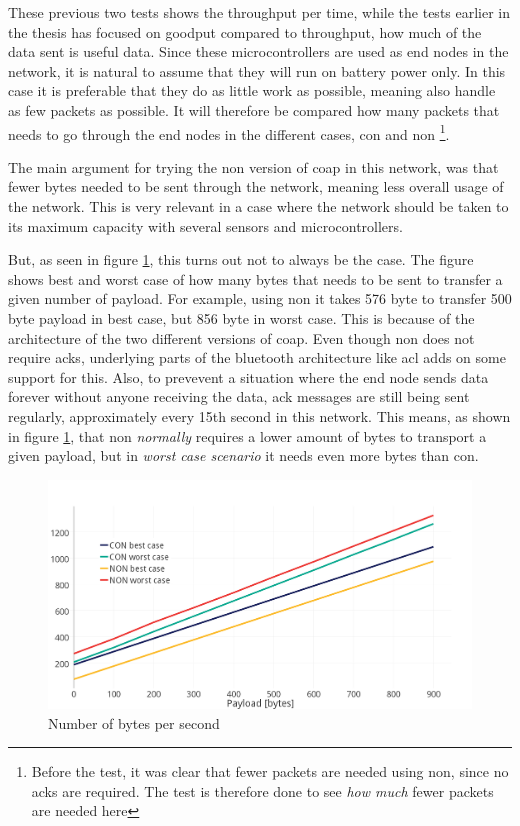 These previous two tests shows the throughput per time, while the tests earlier in the thesis has focused on goodput compared to throughput, how much of the data sent is useful data. Since these \glspl{microcontroller} are used as end nodes in the network, it is natural to assume that they will run on battery power only. In this case it is preferable that they do as little work as possible, meaning also handle as few packets as possible. It will therefore be compared how many packets that needs to go through the end nodes in the different cases, \gls{con} and \gls{non} \footnote{Before the test, it was clear that fewer packets are needed using \gls{non}, since no \glspl{ack} are required. The test is therefore done to see \textit{how much} fewer packets are needed here}.

The main argument for trying the \gls{non} version of \gls{coap} in this network, was that fewer bytes needed to be sent through the network, meaning less overall usage of the network. This is very relevant in a case where the network should be taken to its maximum capacity with several sensors and \glspl{microcontroller}. 

But, as seen in figure \ref{fig:bestCaseworstCase}, this turns out not to always be the case. The figure shows best and worst case of how many bytes that needs to be sent to transfer a given number of \gls{payload}. For example, using \gls{non} it takes 576 byte to transfer 500 byte payload in best case, but 856 byte in worst case. This is because of the architecture of the two different versions of \gls{coap}. Even though \gls{non} does not require \glspl{ack}, underlying parts of the bluetooth architecture like \gls{acl} adds on some support for this. Also, to prevevent a situation where the end node sends data forever without anyone receiving the data, \gls{ack} messages are still being sent regularly, approximately every 15th second in this network. This means, as shown in figure \ref{fig:bestCaseworstCase}, that \gls{non} \textit{normally} requires a lower amount of bytes to transport a given \gls{payload}, but in \textit{worst case scenario} it needs even more bytes than \gls{con}. 


\begin{figure}[ht]
    \centering
    \includegraphics[scale=1.0]{bestCaseworstCase2.png}    
    \caption{Number of bytes per second}
    \label{fig:bestCaseworstCase}
\end{figure}

